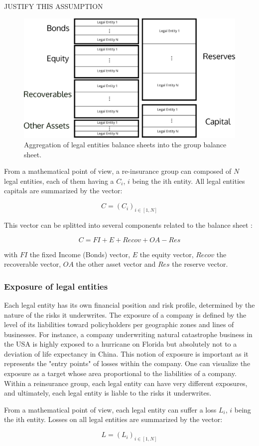 JUSTIFY THIS ASSUMPTION

\begin{figure}[h!]
\centering
  \includegraphics[width=120mm]{images/part1/agreg_balance_sheets.eps}
  \caption{Aggregation of legal entities balance sheets into the group balance sheet.}
  \label{fig:BALANCE_SHEET}
\end{figure}


From a mathematical point of view, a re-insurance group can composed of $N$ legal entities, each of them having a $C_i$, $i$ being the ith entity. All legal entities capitals are summarized by the vector:

\begin{equation}
    C = (C_i)_{i \in [1, N]}
\end{equation}


This vector can be splitted into several components related to the balance sheet :

\begin{equation}
    C = FI + E + Recov + OA - Res
    \label{eq:CAPITAL_DEF}
\end{equation}

with $FI$ the fixed Income (Bonds) vector, $E$ the equity vector, $Recov$ the recoverable vector, $OA$ the other asset vector and $Res$ the reserve vector.


\subsubsection{Exposure of legal entities}
\label{sec:EXPOSURE_DEF}

Each legal entity has its own financial position and risk profile, determined by the nature of the risks it underwrites. The exposure of a company is defined by the level of its liabilities toward policyholders per geographic zones and lines of businesses. For instance, a company underwriting natural catastrophe business in the USA is highly exposed to a hurricane on Florida but absolutely not to a deviation of life expectancy in China. 
This notion of exposure is important as it represents the "entry points" of losses within the company. One can visualize the exposure as a target whose area proportional to the liabilities of a company. Within a reinsurance group, each legal entity can have very different exposures, and ultimately, each legal entity is liable to the risks it underwrites.

From a mathematical point of view, each legal entity can suffer a loss $L_i$, $i$ being the ith entity. Losses on all legal entities are summarized by the vector:

\begin{equation}
    L = (L_i)_{i \in [1, N]}
\end{equation}
